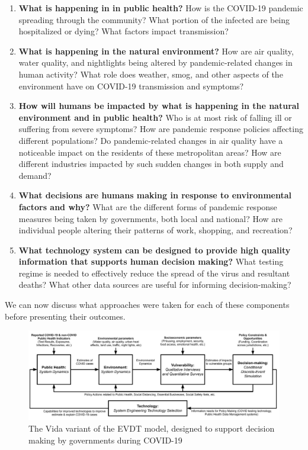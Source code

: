 \begin{enumerate}[itemsep=0pt,parsep=0pt]
	\item \textbf{What is happening in in public health?} How is the COVID-19 pandemic spreading through the community? What portion of the infected are being hospitalized or dying? What factors impact transmission?
	\item \textbf{What is happening in the natural environment?} How are air quality, water quality, and nightlights being altered by pandemic-related changes in human activity? What role does weather, smog, and other aspects of the environment have on COVID-19 transmission and symptoms?
	\item \textbf{How will humans be impacted by what is happening in the natural environment and in public health?} Who is at most risk of falling ill or suffering from severe symptoms? How are pandemic response policies affecting different populations? Do pandemic-related changes in air quality have a noticeable impact on the residents of these metropolitan areas? How are different industries impacted by such sudden changes in both supply and demand?
	\item \textbf{What decisions are humans making in response to environmental factors and why?} What are the different forms of pandemic response measures being taken by governments, both local and national? How are individual people altering their patterns of work, shopping, and recreation?  
	\item \textbf{What technology system can be designed to provide high quality information that supports human decision making?} What testing regime is needed to effectively reduce the spread of the virus and resultant deaths? What other data sources are useful for informing decision-making?
\end{enumerate}

We can now discuss what approaches were taken for each of these components before presenting their outcomes.

\begin{figure}[!htb]
	\centering
	\includegraphics[scale=0.25]{Figures/chap5/Vida_Flowchart_v2.jpg}
	\caption[The Vida Variant of the EVDT Model]{The Vida variant of the EVDT model, designed to support decision making by governments during COVID-19}
	\label{fig:vida_flow}
\end{figure}

